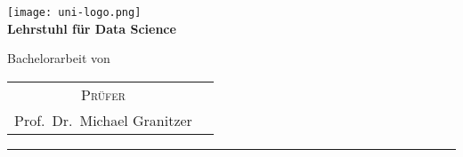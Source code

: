 \begin{titlepage}
    \centering
    \begin{onehalfspace}
    
        	\texttt{[image: uni-logo.png]}\\
        	\vspace{1.0cm}
            \large {\bfseries Lehrstuhl für Data Science} \\

        	\vspace{2.5cm}

            \begin{doublespace}
            	{\textsf{\Huge{\thetitle}}}
            \end{doublespace}

        	\vspace{2cm}

            \Large{Bachelorarbeit von}\\

        	\vspace{1cm}

        	{\bfseries \large{\theauthor}}

        	\vfill

        	{\large
        		\begin{tabular}[l]{cc}
        			\textsc{Prüfer}\\
        			Prof.~Dr.~Michael Granitzer
        		\end{tabular}
        	}

        	\vspace{1.5cm}

        	\parbox{\linewidth}{\hrule\strut}

            \vfill

	    {\thedate}
    	
    \end{onehalfspace}
\end{titlepage}
